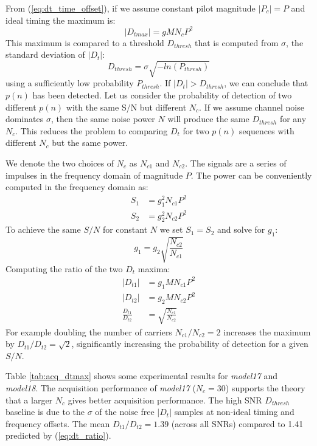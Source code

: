 \documentclass{article}
\begin{document}
From (\ref{eq:dt_time_offset}), if we assume constant pilot magnitude $|P_c|=P$ and ideal timing the maximum is:
\begin{equation}
|D_{tmax}| = g M N_c P^2
\end{equation}
This maximum is compared to a threshold $D_{thresh}$ that is computed from $\sigma$, the standard deviation of $|D_t|$:
\begin{equation}
\label{eq:corr_prob}
D_{thresh} = \sigma\sqrt{-ln(P_{thresh})}
\end{equation}
using a sufficiently low probability $P_{thresh}$. If $|D_t| > D_{thresh}$, we can conclude that $p(n)$ has been detected.  Let us consider the probability of detection of two different $p(n)$ with the same S/N but different $N_c$. If we assume channel noise dominates $\sigma$, then the same noise power $N$ will produce the same $D_{thresh}$ for any $N_c$.  This reduces the problem to comparing $D_t$ for two $p(n)$ sequences with different $N_c$ but the same power.

We denote the two choices of $N_c$ as $N_{c1}$ and $N_{c2}$. The signals are a series of impulses in the frequency domain of magnitude $P$. The power can be conveniently computed in the frequency domain as:
\begin{equation}
\begin{split}
S_1 &= g_1^2 N_{c1} P^2 \\
S_2 &= g_2^2 N_{c2} P^2
\end{split}
\end{equation}
To achieve the same $S/N$ for constant $N$ we set $S_1=S_2$ and solve for $g_1$:
\begin{equation}
g_1=g_2 \sqrt{\frac{N_{c2}}{N_{c1}}}
\end{equation}
Computing the ratio of the two $D_t$ maxima:
\begin{equation}
\label{eq:dt_ratio}
\begin{split}
|D_{t1}| &= g_1 M N_{c1} P^2 \\
|D_{t2}| &= g_2 M N_{c2} P^2 \\
\frac{D_{t1}}{D_{t2}} &= \sqrt{\frac{N_{c1}}{N_{c2}}}
\end{split}
\end{equation}
For example doubling the number of carriers $N_{c1}/N_{c2}=2$ increases the maximum by $D_{t1}/D_{t2}=\sqrt{2}$, significantly increasing the probability of detection for a given $S/N$.

Table \ref{tab:acq_dtmax} shows some experimental results for \emph{model17} and \emph{model18}.  The acquisition performance of \emph{model17} ($N_c=30$) supports the theory that a larger $N_c$ gives better acquisition performance.  The high SNR $D_{thresh}$ baseline is due to the $\sigma$ of the noise free $|D_t|$ samples at non-ideal timing and frequency offsets. The mean $D_{t1}/D_{t2}=1.39$ (across all SNRs) compared to 1.41 predicted by (\ref{eq:dt_ratio}).
 
\end{document}
